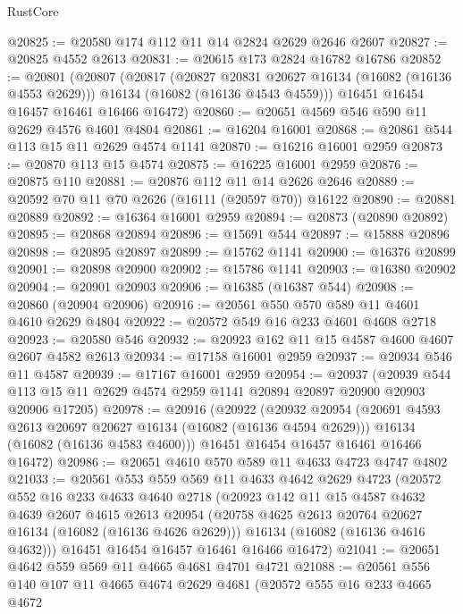 \begin{lexlean}{RustCore}
\begin{coremodule}
@20825 := @20580 @174 @112 @11 @14 @2824 @2629 @2646 @2607
@20827 := @20825 @4552 @2613
@20831 := @20615 @173 @2824 @16782 @16786
@20852 := @20801
    (@20807
      (@20817
        (@20827 @20831 @20627 @16134 (@16082 (@16136 @4553 @2629)))
        @16134
        (@16082 (@16136 @4543 @4559)))
      @16451
      @16454
      @16457
      @16461
      @16466
      @16472)
@20860 := @20651 @4569 @546 @590 @11 @2629 @4576 @4601 @4804
@20861 := @16204 @16001
@20868 := @20861 @544 @113 @15 @11 @2629 @4574 @1141
@20870 := @16216 @16001 @2959
@20873 := @20870 @113 @15 @4574
@20875 := @16225 @16001 @2959
@20876 := @20875 @110
@20881 := @20876 @112 @11 @14 @2626 @2646
@20889 := @20592 @70 @11 @70 @2626 (@16111 (@20597 @70)) @16122
@20890 := @20881 @20889
@20892 := @16364 @16001 @2959
@20894 := @20873 (@20890 @20892)
@20895 := @20868 @20894
@20896 := @15691 @544
@20897 := @15888 @20896
@20898 := @20895 @20897
@20899 := @15762 @1141
@20900 := @16376 @20899
@20901 := @20898 @20900
@20902 := @15786 @1141
@20903 := @16380 @20902
@20904 := @20901 @20903
@20906 := @16385 (@16387 @544)
@20908 := @20860 (@20904 @20906)
@20916 := @20561 @550 @570 @589 @11 @4601 @4610 @2629 @4804
@20922 := @20572 @549 @16 @233 @4601 @4608 @2718
@20923 := @20580 @546
@20932 := @20923 @162 @11 @15 @4587 @4600 @4607 @2607 @4582 @2613
@20934 := @17158 @16001 @2959
@20937 := @20934 @546 @11 @4587
@20939 := @17167 @16001 @2959
@20954 := @20937
    (@20939 @544 @113 @15 @11 @2629 @4574 @2959 @1141 @20894 @20897 @20900 @20903 @20906 @17205)
@20978 := @20916
    (@20922
      (@20932
        @20954
        (@20691 @4593 @2613 @20697 @20627 @16134 (@16082 (@16136 @4594 @2629)))
        @16134
        (@16082 (@16136 @4583 @4600)))
      @16451
      @16454
      @16457
      @16461
      @16466
      @16472)
@20986 := @20651 @4610 @570 @589 @11 @4633 @4723 @4747 @4802
@21033 := @20561
    @553
    @559
    @569
    @11
    @4633
    @4642
    @2629
    @4723
    (@20572
      @552
      @16
      @233
      @4633
      @4640
      @2718
      (@20923
        @142
        @11
        @15
        @4587
        @4632
        @4639
        @2607
        @4615
        @2613
        @20954
        (@20758 @4625 @2613 @20764 @20627 @16134 (@16082 (@16136 @4626 @2629)))
        @16134
        (@16082 (@16136 @4616 @4632)))
      @16451
      @16454
      @16457
      @16461
      @16466
      @16472)
@21041 := @20651 @4642 @559 @569 @11 @4665 @4681 @4701 @4721
@21088 := @20561
    @556
    @140
    @107
    @11
    @4665
    @4674
    @2629
    @4681
    (@20572
      @555
      @16
      @233
      @4665
      @4672

\end{coremodule}
\end{lexlean}

